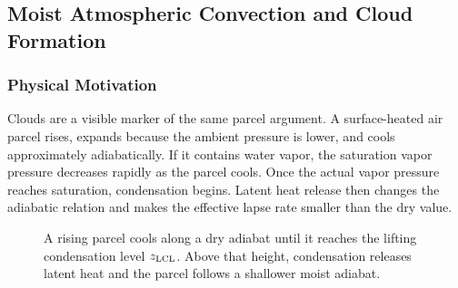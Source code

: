 \subsection{Moist Atmospheric Convection and Cloud Formation}
\label{sec:lec08:moist-convection-clouds}

\subsubsection*{Physical Motivation}
Clouds are a visible marker of the same parcel argument. A surface-heated air
parcel rises, expands because the ambient pressure is lower, and cools
approximately adiabatically. If it contains water vapor, the saturation vapor
pressure decreases rapidly as the parcel cools. Once the actual vapor pressure
reaches saturation, condensation begins. Latent heat release then changes the
adiabatic relation and makes the effective lapse rate smaller than the dry
value.

\begin{figure}[ht]
    \centering
    \caption{A rising parcel cools along a dry adiabat until it reaches the
    lifting condensation level $z_{\rm LCL}$. Above that height, condensation
    releases latent heat and the parcel follows a shallower moist adiabat.}
    \label{fig:lec08:moist-parcel-cloud}
\end{figure}

